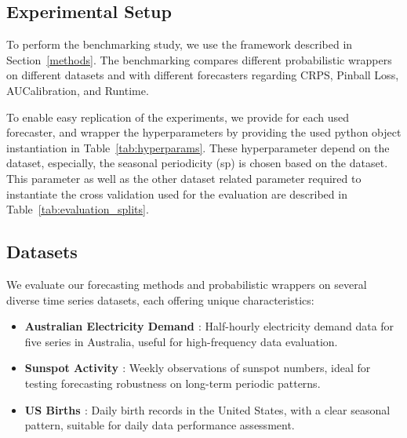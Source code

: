 

\subsection{Experimental Setup}
To perform the benchmarking study, we use the framework described in Section~\ref{methods}. The benchmarking compares different probabilistic wrappers on different datasets and with different forecasters regarding CRPS, Pinball Loss, AUCalibration, and Runtime. 

To enable easy replication of the experiments, we provide for each used forecaster, and wrapper the hyperparameters by providing the used python object instantiation in Table~\ref{tab:hyperparams}. These hyperparameter depend on the dataset, especially, the seasonal periodicity (sp) is chosen based on the dataset. This parameter as well as the other dataset related parameter required to instantiate the cross validation used for the evaluation are described in Table~\ref{tab:evaluation_splits}.

\subsection{Datasets} \label{datasets}
We evaluate our forecasting methods and probabilistic wrappers on several diverse time series datasets, each offering unique characteristics:

\begin{itemize}
    \item \textbf{Australian Electricity Demand \cite{Godahewa2021Australian}}: Half-hourly electricity demand data for five series in Australia, useful for high-frequency data evaluation.
    \item \textbf{Sunspot Activity \cite{Godahewa2021Sunspot}}: Weekly observations of sunspot numbers, ideal for testing forecasting robustness on long-term periodic patterns.
    \item \textbf{US Births \cite{Godahewa2021USBirth}}: Daily birth records in the United States, with a clear seasonal pattern, suitable for daily data performance assessment.
\end{itemize}


